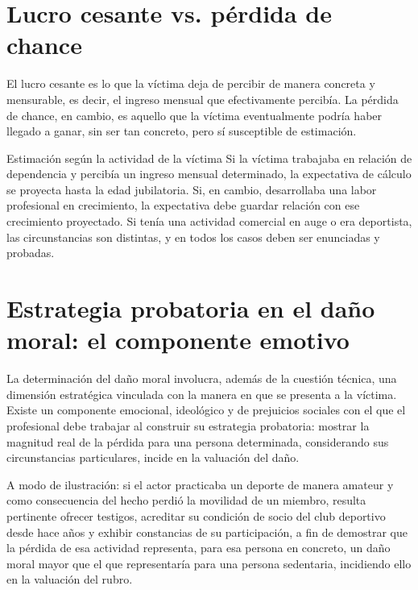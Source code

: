 \documentclass[12pt,oneside]{book}
\begin{document}
\section{Lucro cesante vs. pérdida de chance}

El lucro cesante es lo que la víctima deja de percibir de manera concreta y mensurable, es decir, el ingreso mensual que efectivamente percibía. La pérdida de chance, en cambio, es aquello que la víctima eventualmente podría haber llegado a ganar, sin ser tan concreto, pero sí susceptible de estimación.

\begin{example}{Estimación según la actividad de la víctima}
Si la víctima trabajaba en relación de dependencia y percibía un ingreso mensual determinado, la expectativa de cálculo se proyecta hasta la edad jubilatoria. Si, en cambio, desarrollaba una labor profesional en crecimiento, la expectativa debe guardar relación con ese crecimiento proyectado. Si tenía una actividad comercial en auge o era deportista, las circunstancias son distintas, y en todos los casos deben ser enunciadas y probadas.
\end{example}

\section{Estrategia probatoria en el daño moral: el componente emotivo}

\begin{note}
La determinación del daño moral involucra, además de la cuestión técnica, una dimensión estratégica vinculada con la manera en que se presenta a la víctima. Existe un componente emocional, ideológico y de prejuicios sociales con el que el profesional debe trabajar al construir su estrategia probatoria: mostrar la magnitud real de la pérdida para una persona determinada, considerando sus circunstancias particulares, incide en la valuación del daño.
\end{note}

A modo de ilustración: si el actor practicaba un deporte de manera amateur y como consecuencia del hecho perdió la movilidad de un miembro, resulta pertinente ofrecer testigos, acreditar su condición de socio del club deportivo desde hace años y exhibir constancias de su participación, a fin de demostrar que la pérdida de esa actividad representa, para esa persona en concreto, un daño moral mayor que el que representaría para una persona sedentaria, incidiendo ello en la valuación del rubro.
\end{document}
